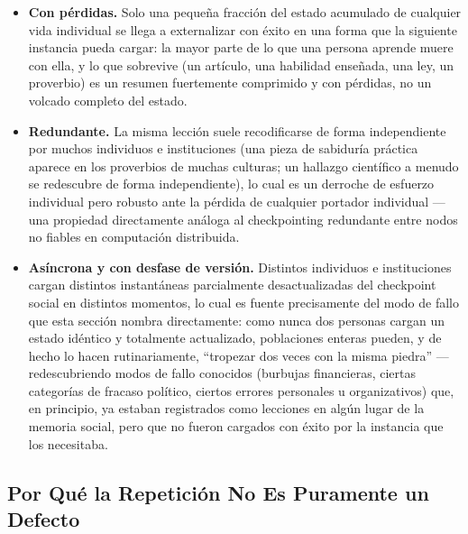 \documentclass[11pt]{article}
\begin{document}
\begin{itemize}[leftmargin=1.5em]
    \item \textbf{Con pérdidas.} Solo una pequeña fracción del estado acumulado de cualquier vida individual se llega a externalizar con éxito en una forma que la siguiente instancia pueda cargar: la mayor parte de lo que una persona aprende muere con ella, y lo que sobrevive (un artículo, una habilidad enseñada, una ley, un proverbio) es un resumen fuertemente comprimido y con pérdidas, no un volcado completo del estado.
    \item \textbf{Redundante.} La misma lección suele recodificarse de forma independiente por muchos individuos e instituciones (una pieza de sabiduría práctica aparece en los proverbios de muchas culturas; un hallazgo científico a menudo se redescubre de forma independiente), lo cual es un derroche de esfuerzo individual pero robusto ante la pérdida de cualquier portador individual —una propiedad directamente análoga al checkpointing redundante entre nodos no fiables en computación distribuida.
    \item \textbf{Asíncrona y con desfase de versión.} Distintos individuos e instituciones cargan distintos instantáneas parcialmente desactualizadas del checkpoint social en distintos momentos, lo cual es fuente precisamente del modo de fallo que esta sección nombra directamente: como nunca dos personas cargan un estado idéntico y totalmente actualizado, poblaciones enteras pueden, y de hecho lo hacen rutinariamente, ``tropezar dos veces con la misma piedra'' —redescubriendo modos de fallo conocidos (burbujas financieras, ciertas categorías de fracaso político, ciertos errores personales u organizativos) que, en principio, ya estaban registrados como lecciones en algún lugar de la memoria social, pero que no fueron cargados con éxito por la instancia que los necesitaba.
\end{itemize}

\subsection{Por Qué la Repetición No Es Puramente un Defecto}
\end{document}
